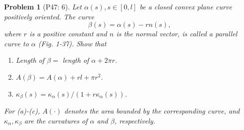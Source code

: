 \documentclass[12pt,a4paper]{article}
\newcounter{theProblemCounter}
\newtheorem{problem}[theProblemCounter]{Problem}
\begin{document}
\setcounter{theProblemCounter}{4}
\begin{problem}[P47: 6]
Let $\alpha(s), s\in [0, l]$ be a closed convex plane curve positively oriented. The curve
\[ \beta(s)=\alpha(s) - rn(s),\]
where $r$ is a positive constant and $n$ is the normal vector, is called a \emph{parallel} curve to $\alpha$ (Fig. 1-37). Show that
\begin{enumerate}
\item[(a)] Length of $\beta = $ length of $\alpha + 2\pi r$.
\item[(b)] $A(\beta)=A(\alpha)+rl+\pi r^2$.
\item[(c)] $\kappa_\beta(s) = \kappa_\alpha(s)/(1+r\kappa_\alpha(s))$.
\end{enumerate}
For (a)-(c), $A(\cdot)$ denotes the area bounded by the corresponding curve, and $\kappa_\alpha, \kappa_\beta$ are the curvatures of $\alpha$ and $\beta$, respectively.
\end{problem}
\end{document}

